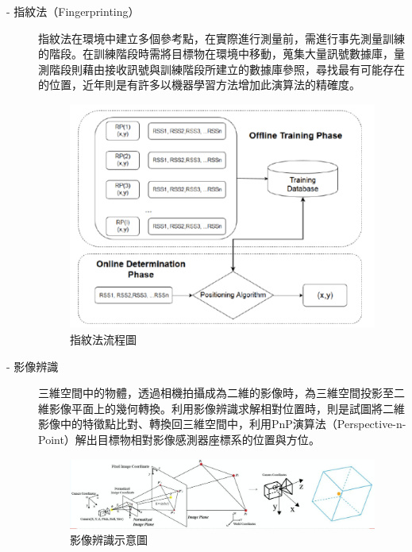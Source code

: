 \begin{description}
        \item[- 指紋法（Fingerprinting）] \hfill 
        
        \qquad
        指紋法在環境中建立多個參考點，在實際進行測量前，需進行事先測量訓練的階段。在訓練階段時需將目標物在環境中移動，蒐集大量訊號數據庫，量測階段則藉由接收訊號與訓練階段所建立的數據庫參照，尋找最有可能存在的位置\cite{survey_light2020}，近年則是有許多以機器學習方法增加此演算法的精確度。
        \begin{figure}[htpb]
            \centering
            \includegraphics[width=13cm]{ch2pic/fingerprinting.png}
            \caption{指紋法流程圖\cite{pic:fingerprinting}}
            \label{pic:fingerprinting}
        \end{figure}
        
        \item[- 影像辨識]\hfill 
        
        \qquad
        三維空間中的物體，透過相機拍攝成為二維的影像時，為三維空間投影至二維影像平面上的幾何轉換。利用影像辨識求解相對位置時，則是試圖將二維影像中的特徵點比對、轉換回三維空間中，利用PnP演算法（Perspective-n-Point）解出目標物相對影像感測器座標系的位置與方位\cite{pic:image_processing}。
        
        \begin{figure}[htpb]
            \centering
            \includegraphics[width=15cm]{ch2pic/image_processing.png}
            \caption{影像辨識示意圖\cite{pic:image_processing}}
            \label{pic:image_processing}
        \end{figure}
        

\end{description}

